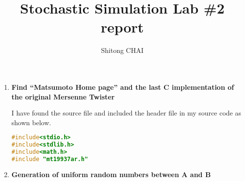\documentclass{article}
\title{Stochastic Simulation Lab \#2 report}
\author{Shitong CHAI}
\date{}
\begin{document}
\maketitle 

\begin{enumerate}
\item{\textbf{Find “Matsumoto Home page” and the last C implementation of the original Mersenne Twister}}

I have found the source file and included the header file in my source code as shown below.
\begin{lstlisting}[language=C]
#include<stdio.h>
#include<stdlib.h>
#include<math.h>
#include "mt19937ar.h"
\end{lstlisting}

\item{\textbf{Generation of uniform random numbers between A and B}}

\end{enumerate}
\end{document}
